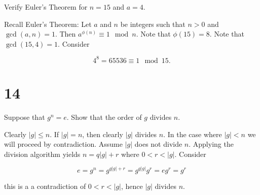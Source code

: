 \documentclass[a4paper]{article}
\begin{document}
Verify Euler's Theorem for $n=15$ and $a=4$.

\vspace{\baselineskip}

Recall Euler's Theorem: Let $a$ and $n$ be integers such that $n > 0$ and $\gcd(a,n) = 1$. Then $a^{\phi(n)} \equiv 1 \mod n$. Note that $\phi(15) = 8$. Note that $\gcd(15, 4) = 1$. Consider

$$4^8 = 65536 \equiv 1 \mod 15.$$


\section*{14}

Suppose that $g^n = e$. Show that the order of $g$ divides $n$.

\vspace{\baselineskip}

Clearly $|g| \leq n$. If $|g| = n$, then clearly $|g|$ divides $n$. In the case where $|g| < n$ we will proceed by contradiction. Assume $|g|$ does not divide $n$. Applying the division algorithm yields $n = q|g| + r$ where $0 < r < |g|$. Consider

$$e = g^n = g^{q|g| + r} = g^{q|g|}g^r = eg^r = g^r$$

this is a a contradiction of $0 < r < |g|$, hence $|g|$ divides $n$.
\end{document}
